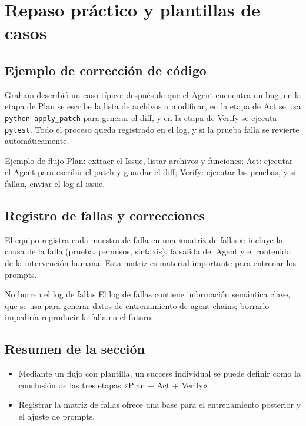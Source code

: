 \section{Repaso práctico y plantillas de casos}
\subsection{Ejemplo de corrección de código}
Graham describió un caso típico: después de que el Agent encuentra un bug, en la etapa de Plan se escribe la lista de archivos a modificar, en la etapa de Act se usa \texttt{python apply\_patch} para generar el diff, y en la etapa de Verify se ejecuta \texttt{pytest}. Todo el proceso queda registrado en el log, y si la prueba falla se revierte automáticamente.

\begin{knowledgebox}{Ejemplo de flujo}
Plan: extraer el Issue, listar archivos y funciones; Act: ejecutar el Agent para escribir el patch y guardar el diff; Verify: ejecutar las pruebas, y si fallan, enviar el log al issue.
\end{knowledgebox}

\subsection{Registro de fallas y correcciones}
El equipo registra cada muestra de falla en una «matriz de fallas»: incluye la causa de la falla (prueba, permisos, sintaxis), la salida del Agent y el contenido de la intervención humana. Esta matriz es material importante para entrenar los prompts.

\begin{warningbox}{No borren el log de fallas}
El log de fallas contiene información semántica clave, que se usa para generar datos de entrenamiento de agent chains; borrarlo impediría reproducir la falla en el futuro.
\end{warningbox}

\subsection{Resumen de la sección}
\begin{itemize}
    \item Mediante un flujo con plantilla, un success individual se puede definir como la conclusión de las tres etapas «Plan + Act + Verify».
    \item Registrar la matriz de fallas ofrece una base para el entrenamiento posterior y el ajuste de prompts.
\end{itemize}
